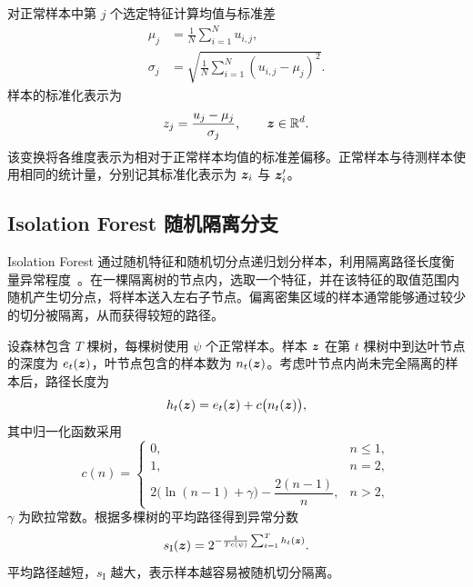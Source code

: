 对正常样本中第 $j$ 个选定特征计算均值与标准差
\begin{equation}
\begin{aligned}
  \mu_j&=\frac{1}{N}\sum_{i=1}^{N}u_{i,j},\\
  \sigma_j&=\sqrt{\frac{1}{N}\sum_{i=1}^{N}(u_{i,j}-\mu_j)^2}.
\end{aligned}
\label{eq:task4-statistics}
\end{equation}
样本的标准化表示为
\begin{equation}
  z_j=\frac{u_j-\mu_j}{\sigma_j},
  \qquad \bm{z}\in\mathbb R^d.
  \label{eq:task4-standardization}
\end{equation}
该变换将各维度表示为相对于正常样本均值的标准差偏移。正常样本与待测样本使用相同的统计量，分别记其标准化表示为 $\bm{z}_i$ 与 $\bm{z}'_i$。

\subsection{Isolation Forest 随机隔离分支}
Isolation Forest 通过随机特征和随机切分点递归划分样本，利用隔离路径长度衡量异常程度~\cite{liu2008isolation}。在一棵隔离树的节点内，选取一个特征，并在该特征的取值范围内随机产生切分点，将样本送入左右子节点。偏离密集区域的样本通常能够通过较少的切分被隔离，从而获得较短的路径。

设森林包含 $T$ 棵树，每棵树使用 $\psi$ 个正常样本。样本 $\bm{z}$ 在第 $t$ 棵树中到达叶节点的深度为 $e_t(\bm{z})$，叶节点包含的样本数为 $n_t(\bm{z})$。考虑叶节点内尚未完全隔离的样本后，路径长度为
\begin{equation}
  h_t(\bm{z})=e_t(\bm{z})+c\bigl(n_t(\bm{z})\bigr),
  \label{eq:task4-path}
\end{equation}
其中归一化函数采用
\begin{equation}
  c(n)=
  \begin{cases}
    0, & n\leq 1,\\
    1, & n=2,\\
    2\bigl(\ln(n-1)+\gamma\bigr)-\dfrac{2(n-1)}{n}, & n>2,
  \end{cases}
  \label{eq:task4-path-normalizer}
\end{equation}
$\gamma$ 为欧拉常数。根据多棵树的平均路径得到异常分数
\begin{equation}
  s_{\mathrm I}(\bm{z})
  =2^{-\frac{1}{T c(\psi)}\sum_{t=1}^{T}h_t(\bm{z})}.
  \label{eq:task4-iforest}
\end{equation}
平均路径越短，$s_{\mathrm I}$ 越大，表示样本越容易被随机切分隔离。

